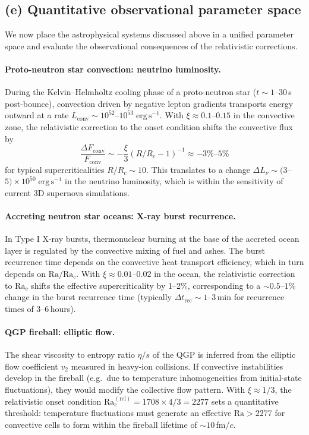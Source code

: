 \subsection*{(e) Quantitative observational parameter space}

We now place the astrophysical systems discussed above in a unified
parameter space and evaluate the observational consequences of the
relativistic corrections.

\paragraph{Proto-neutron star convection: neutrino luminosity.}
During the Kelvin--Helmholtz cooling phase of a proto-neutron star
($t\sim 1$--$30$\,s post-bounce), convection driven by negative
lepton gradients transports energy outward at a rate
$L_{\mathrm{conv}}\sim 10^{52}$--$10^{53}\;\mathrm{erg\,s^{-1}}$.
With $\xi\approx 0.1$--$0.15$ in the convective zone, the relativistic
correction to the onset condition shifts the convective flux by
\[
\frac{\Delta F_{\mathrm{conv}}}{F_{\mathrm{conv}}}
\sim -\frac{\xi}{3}(R/R_c - 1)^{-1}
\approx -3\%\text{--}5\%
\]
for typical supercriticalities $R/R_c\sim 10$.  This translates to a
change $\Delta L_\nu\sim (3$--$5)\times 10^{50}\;\mathrm{erg\,s^{-1}}$
in the neutrino luminosity, which is within the sensitivity of current
3D supernova simulations.

\paragraph{Accreting neutron star oceans: X-ray burst recurrence.}
In Type I X-ray bursts, thermonuclear burning at the base of the
accreted ocean layer is regulated by the convective mixing of fuel
and ashes.  The burst recurrence time depends on the convective heat
transport efficiency, which in turn depends on $\mathrm{Ra}/\mathrm{Ra}_c$.
With $\xi\approx 0.01$--$0.02$ in the ocean, the relativistic correction
to $\mathrm{Ra}_c$ shifts the effective supercriticality by 1--2\%,
corresponding to a $\sim 0.5$--$1$\% change in the burst recurrence
time (typically $\Delta t_{\mathrm{rec}}\sim 1$--$3$\,min for
recurrence times of 3--6\,hours).

\paragraph{QGP fireball: elliptic flow.}
The shear viscosity to entropy ratio $\eta/s$ of the QGP is inferred
from the elliptic flow coefficient $v_2$ measured in heavy-ion
collisions.  If convective instabilities develop in the fireball
(e.g.\ due to temperature inhomogeneities from initial-state
fluctuations), they would modify the collective flow pattern.
With $\xi\approx 1/3$, the relativistic onset condition
$\mathrm{Ra}_c^{(\mathrm{rel})}=1708\times 4/3=2277$ sets a
quantitative threshold: temperature fluctuations must generate an
effective $\mathrm{Ra}>2277$ for convective cells to form within the
fireball lifetime of $\sim 10$\,fm/$c$.

